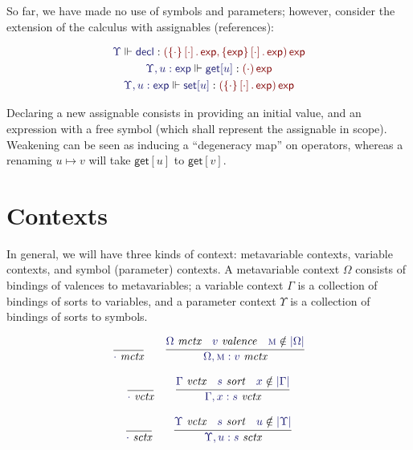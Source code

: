 \documentclass[11pt]{article}
\theoremstyle{definition}
\theoremstyle{remark}
\numberwithin{equation}{section}
\def\IModeColorName{MidnightBlue}
\def\OModeColorName{Maroon}
\newcommand\IMode[1]{{\color{\IModeColorName}{#1}}}
\newcommand\OMode[1]{{\color{\OModeColorName}{#1}}}
\newcommand\MkValence[3]{\left\{#1\right\}\left[#2\right].\, #3}
\newcommand\MkArity[2]{\left(#1\right) #2}
\newcommand\IsValence[1]{\IMode{#1}\ \textit{valence}}
\newcommand\IsSort[1]{\IMode{#1}\ \textit{sort}}
\newcommand\IsOperator[3]{\IMode{#1}\Vdash \IMode{#2} : \OMode{#3}}
\newcommand\IsMetaCtx[1]{\IMode{#1}\ \textit{mctx}}
\newcommand\IsVarCtx[1]{\IMode{#1}\ \textit{vctx}}
\newcommand\IsSymCtx[1]{\IMode{#1}\ \textit{sctx}}
\newcommand\MV[1]{\textsc{#1}}
\newcommand\Dom[1]{\left\vert #1\right\vert}
\newcommand\NotIn[2]{\IMode{#1}\notin\IMode{#2}}
\newcommand\SortExp{\mathsf{exp}}
\begin{document}
So far, we have made no use of symbols and parameters; however, consider the
extension of the calculus with assignables (references):

\begin{gather*}
  \IsOperator{\Upsilon}{\mathsf{decl}}{
    \MkArity{
      \MkValence{\cdot}{\cdot}{\SortExp},
      \MkValence{\SortExp}{\cdot}{\SortExp}
    }{
      \SortExp
    }
  }\\
  \IsOperator{\Upsilon,u:\SortExp}{\mathsf{get}[u]}{
    \MkArity{
      \cdot
    }{
      \SortExp
    }
  }\\
  \IsOperator{\Upsilon,u:\SortExp}{\mathsf{set}[u]}{
    \MkArity{
      \MkValence{\cdot}{\cdot}{\SortExp}
    }{
      \SortExp
    }
  }
\end{gather*}

Declaring a new assignable consists in providing an initial value, and an
expression with a free symbol (which shall represent the assignable in scope).
Weakening can be seen as inducing a ``degeneracy map'' on operators, whereas a
renaming $u\mapsto v$ will take $\mathsf{get}[u]$ to $\mathsf{get}[v]$.

\section{Contexts}

In general, we will have three kinds of context: metavariable contexts,
variable contexts, and symbol (parameter) contexts. A metavariable context
$\Omega$ consists of bindings of valences to metavariables; a variable context
$\Gamma$ is a collection of bindings of sorts to variables, and a parameter
context $\Upsilon$ is a collection of bindings of sorts to symbols.

\begin{gather*}
  \infer{
    \IsMetaCtx{\cdot}
  }{
  }\qquad
  \infer{
    \IsMetaCtx{\Omega,\MV{m}:v}
  }{
    \IsMetaCtx{\Omega} &
    \IsValence{v} &
    \NotIn{\MV{m}}{\Dom\Omega}
  }
\end{gather*}

\begin{gather*}
  \infer{
    \IsVarCtx{\cdot}
  }{
  }\qquad
  \infer{
    \IsVarCtx{\Gamma,x:s}
  }{
    \IsVarCtx{\Gamma} &
    \IsSort{s} &
    \NotIn{x}{\Dom\Gamma}
  }
\end{gather*}

\begin{gather*}
  \infer{
    \IsSymCtx{\cdot}
  }{
  }\qquad
  \infer{
    \IsSymCtx{\Upsilon,u:s}
  }{
    \IsVarCtx{\Upsilon} &
    \IsSort{s} &
    \NotIn{u}{\Dom\Upsilon}
  }
\end{gather*}
\end{document}
